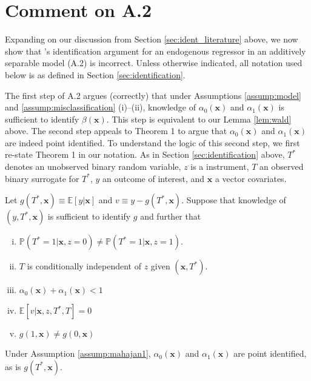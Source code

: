 \section{Comment on \cite{Mahajan} A.2}
\label{sec:mahajan}
Expanding on our discussion from Section \ref{sec:ident_literature} above, we now show that \citeauthor{Mahajan}'s identification argument for an endogenous regressor in an additively separable model (A.2) is incorrect.
Unless otherwise indicated, all notation used below is as defined in Section \ref{sec:identification}.

The first step of \cite{Mahajan} A.2 argues (correctly) that under Assumptions \ref{assump:model} and \ref{assump:misclassification} (i)--(ii), knowledge of $\alpha_0(\mathbf{x})$ and $\alpha_1(\mathbf{x})$ is sufficient to identify $\beta(\mathbf{x})$. 
This step is equivalent to our Lemma \ref{lem:wald} above.
The second step appeals to \cite{Mahajan} Theorem 1 to argue that $\alpha_0(\mathbf{x})$ and $\alpha_1(\mathbf{x})$ are indeed point identified.
To understand the logic of this second step, we first re-state \cite{Mahajan} Theorem 1 in our notation.
As in Section \ref{sec:identification} above, $T^*$ denotes an unobserved binary random variable, $z$ is a instrument, $T$ an observed binary surrogate for $T^*$, $y$ an outcome of interest, and $\mathbf{x}$ a vector covariates.

\begin{assump}
  Let $g(T^*, \mathbf{x}) \equiv \mathbb{E}[y|\mathbf{x}]$ and $v \equiv y - g(T^*,\mathbf{x})$.
  Suppose that knowledge of $(y,T^*,\mathbf{x})$ is sufficient to identify $g$ and further that
  \begin{enumerate}[(i)]
    \item $\mathbb{P}(T^*=1|\mathbf{x},z=0) \neq \mathbb{P}(T^*=1|\mathbf{x},z=1)$.
    \item $T$ is conditionally independent of $z$ given $(\mathbf{x}, T^*)$.
    \item $\alpha_0(\mathbf{x}) + \alpha_1(\mathbf{x}) < 1$
    \item $\mathbb{E}[v|\mathbf{x},z,T^*,T] = 0$
    \item $g(1,\mathbf{x}) \neq g(0, \mathbf{x})$
  \end{enumerate}
  \label{assump:mahajan1}
\end{assump}

\begin{thm}
  Under Assumption \ref{assump:mahajan1}, $\alpha_0(\mathbf{x})$ and $\alpha_1(\mathbf{x})$ are point identified, as is $g(T^*,\mathbf{x})$.
  \label{thm:mahajan1}
\end{thm}

